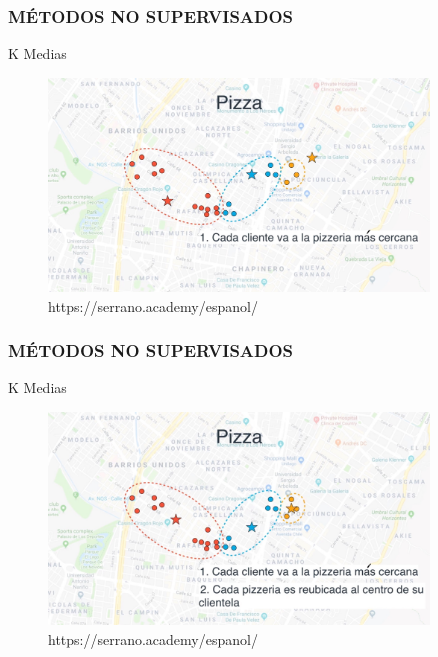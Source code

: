 \documentclass{beamer}
\begin{document}
\begin{frame}
	\frametitle{MÉTODOS NO SUPERVISADOS}
	\begin{block}{K Medias}	
		\begin{figure}
			\includegraphics[width=0.9\textwidth]{Imagenes_k_means/IMG_3511.jpg}
			\caption{https://serrano.academy/espanol/}
		\end{figure}
	\end{block}
\end{frame}


\begin{frame}
	\frametitle{MÉTODOS NO SUPERVISADOS}
	\begin{block}{K Medias}	
		\begin{figure}
			\includegraphics[width=0.9\textwidth]{Imagenes_k_means/IMG_3512.jpg}
			\caption{https://serrano.academy/espanol/}
		\end{figure}
	\end{block}
\end{frame}
\end{document}
